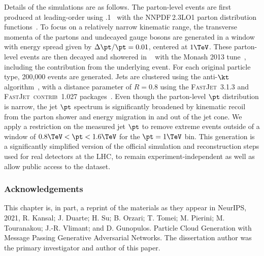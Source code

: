 Details of the simulations are as follows.
The parton-level events are first produced at leading-order using .1~\cite{Alwall:2011uj} with the NNPDF\,2.3LO1 parton distribution functions~\cite{Ball:2012cx}.
To focus on a relatively narrow kinematic range, the transverse momenta of the partons and undecayed gauge bosons are generated in a window with energy spread given by $\Delta \pt / \pt = 0.01$, centered at $1\TeV$.
These parton-level events are then decayed and showered in ~\cite{pythia} with the Monash 2013 tune~\cite{Skands:2014pea}, including the contribution from the underlying event.
For each original particle type, 200,000 events are generated.
Jets are clustered using the anti-$\kt$ algorithm~\cite{Cacciari:2008gp}, with a distance parameter of $R = 0.8$ using the \textsc{FastJet}~3.1.3 and \textsc{FastJet~contrib}~1.027 packages~\cite{fastjet:1,fastjet:2}.
Even though the parton-level $\pt$ distribution is narrow, the jet $\pt$ spectrum is significantly broadened by kinematic recoil from the parton shower and energy migration in and out of the jet cone.
We apply a restriction on the measured jet $\pt$ to remove extreme events outside of a window of $0.8\TeV < \pt < 1.6\TeV$ for the $\pt = 1\TeV$ bin.
This generation is a significantly simplified version of the official simulation and reconstruction steps used for real detectors at the LHC, to remain experiment-independent as well as allow public access to the dataset.


\subsubsection{Acknowledgements}

This chapter is, in part, a reprint of the materials as they appear in
NeurIPS, 2021, R. Kansal; J. Duarte; H. Su; B. Orzari; T. Tomei; M. Pierini; M. Touranakou; J.-R. Vlimant; and D. Gunopulos. Particle Cloud Generation with Message Passing Generative Adversarial Networks.
The dissertation author was the primary investigator and author of this paper.
